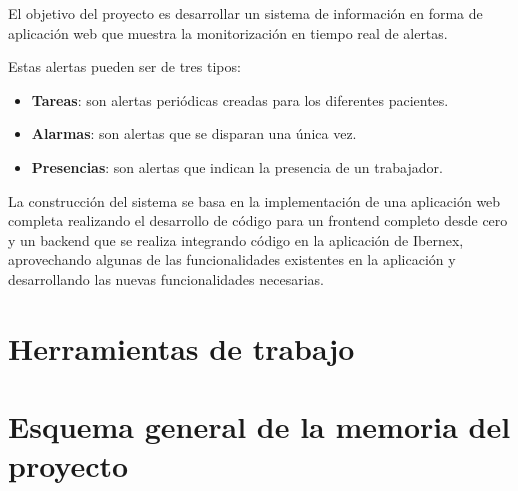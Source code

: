 

El objetivo del proyecto es desarrollar un sistema de información en forma de aplicación web que muestra la monitorización en tiempo real de alertas. \newline

Estas alertas pueden ser de tres tipos:
\begin{itemize}
    \item \textbf{Tareas}: son alertas periódicas creadas para los diferentes pacientes.
    \item \textbf{Alarmas}: son alertas que se disparan una única vez.
    \item \textbf{Presencias}: son alertas que indican la presencia de un trabajador.
\end{itemize}

La construcción del sistema se basa en la implementación de una aplicación web completa realizando el desarrollo de código para un frontend completo desde cero y un backend que se realiza integrando código en la aplicación de Ibernex, aprovechando algunas de las funcionalidades existentes en la aplicación y desarrollando las nuevas funcionalidades necesarias. \newline



\section{Herramientas de trabajo}


\section{Esquema general de la memoria del proyecto}










